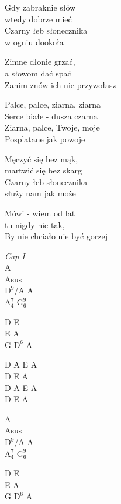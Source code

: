 
\begin{text}
    \chordfill
    Gdy zabraknie słów\\
    wtedy dobrze mieć\\
    Czarny łeb słonecznika\\
    w ogniu dookoła

    Zimne dłonie grzać,\\
    a słowom dać spać\\
    Zanim znów ich nie przywołasz

    \vin Palce, palce, ziarna, ziarna\\
    \vin Serce białe - dusza czarna\\
    \vin Ziarna, palce, Twoje, moje\\
    \vin Posplatane jak powoje

    Męczyć się bez mąk,\\
    martwić się bez skarg\\
    Czarny łeb słonecznika\\
    służy nam jak może

    Mówi - wiem od lat\\
    tu nigdy nie tak,\\
    By nie chciało nie być gorzej
\end{text}
\begin{chord}
    \textit{Cap I}\\
    A\\
    Asus\\
    $\mathrm{D^{9}}$/A A\\
    $\mathrm{A_4^7}$ $\mathrm{G_6^9}$

    D E\\
    E A\\
    G $\mathrm{D^6}$ A

    D A E A\\
    D E A\\
    D A E A\\
    D E A

    A\\
    Asus\\
    $\mathrm{D^{9}}$/A A\\
    $\mathrm{A_4^7}$ $\mathrm{G_6^9}$

    D E\\
    E A\\
    G $\mathrm{D^6}$ A
\end{chord}
